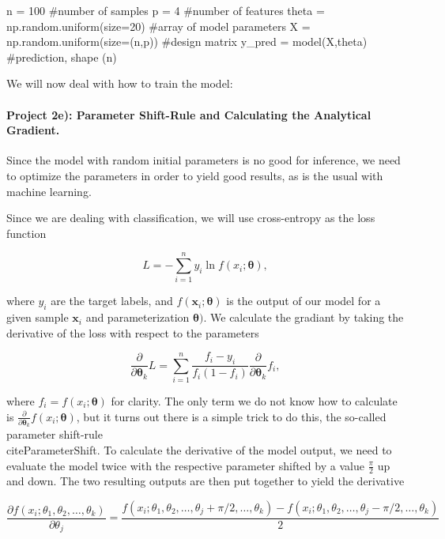\documentclass[%
oneside,                 %
final,                   %
10pt]{article}
\begin{document}
\bpycod
n = 100 #number of samples
p = 4 #number of features
theta = np.random.uniform(size=20) #array of model parameters
X = np.random.uniform(size=(n,p)) #design matrix
y_pred = model(X,theta) #prediction, shape (n)
\epycod



We will now deal with how to train the model:

\paragraph{Project 2e): Parameter Shift-Rule and Calculating the Analytical Gradient.}
Since the model with random initial parameters is no good for
inference, we need to optimize the parameters in order to yield good
results, as is the usual with machine learning.

Since we are dealing with classification, we will use cross-entropy as the loss function

\begin{equation*}
    L = -\sum_{i=1}^{n}{y_i \ln{f(x_i;\boldsymbol{\theta})}},
\end{equation*}

where $y_i$ are the target labels, and
$f(\boldsymbol{x}_i;\boldsymbol{\theta})$ is the output of our model
for a given sample $\boldsymbol{x}_i$ and parameterization
$\boldsymbol{\theta})$. We calculate the gradiant by taking the
derivative of the loss with respect to the parameters

\begin{equation*}
    \frac{\partial}{\partial \boldsymbol{\theta}_k}L = \sum_{i=1}^{n}{\frac{f_i - y_i}{f_i(1 - f_i)}} \frac{\partial}{\partial \boldsymbol{\theta}_k}f_i,
\end{equation*}

where $f_i = f(x_i;\boldsymbol{\theta})$ for clarity. The only term we do not know how to calculate is $\frac{\partial}{\partial \boldsymbol{\theta}_k}f(x_i;\boldsymbol{\theta})$, but it turns out there is a simple trick to do this, the so-called parameter shift-rule \\cite{ParameterShift}. To calculate the derivative of the model output, we need to evaluate the model twice with the respective parameter shifted by a value $\frac{\pi}{2}$ up and down. The two resulting outputs are then put together to yield the derivative



\begin{equation*}
    \frac{\partial f(x_i; \theta_1, \theta_2, \dots, \theta_k)}{\partial \theta_j}  = \frac{f(x_i; \theta_1, \theta_2, \dots, \theta_j + \pi /2, \dots, \theta_k) -f(x_i; \theta_1, \theta_2, \dots, \theta_j - \pi /2, \dots, \theta_k)}{2}
\end{equation*}
\end{document}
